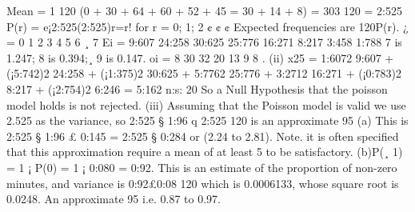 Mean =
1
120
(0 + 30 + 64 + 60 + 52 + 45 = 30 + 14 + 8) =
303
120
= 2:525
P(r) = e¡2:525(2:525)r=r! for r = 0; 1; 2 ¢ ¢ ¢
Expected frequencies are 120P(r).
¿ = 0 1 2 3 4 5 6 ¸ 7
Ei = 9:607 24:258 30:625 25:776 16:271 8:217 3:458 1:788
7 is 1.247; 8 is 0.394;¸ 9 is 0.147.
oi = 8 30 32 20 13 9 8
.
(ii)
x25
=
1:6072
9:607
+
(¡5:742)2
24:258
+
(¡1:375)2
30:625
+
5:7762
25:776
+
3:2712
16:271
+
(¡0:783)2
8:217
+
(¡2:754)2
6:246
= 5:162 n:s:
20
So a Null Hypothesis that the poisson model holds is not rejected.
(iii) Assuming that the Poisson model is valid we use 2.525 as the variance, so
2:525 § 1:96
q
2:525
120 is an approximate 95%
(a) This is 2:525 § 1:96 £ 0:145 = 2:525 § 0:284 or (2.24 to 2.81).
Note. it is often specified that this approximation require a mean of at least 5 to be
satisfactory.
(b)P(¸ 1) = 1 ¡ P(0) = 1 ¡ 0:080 = 0:92. This is an estimate of the proportion
of non-zero minutes, and variance is 0:92£0:08
120 which is 0.0006133, whose square root is
0.0248.
An approximate 95%
i.e. 0.87 to 0.97.
